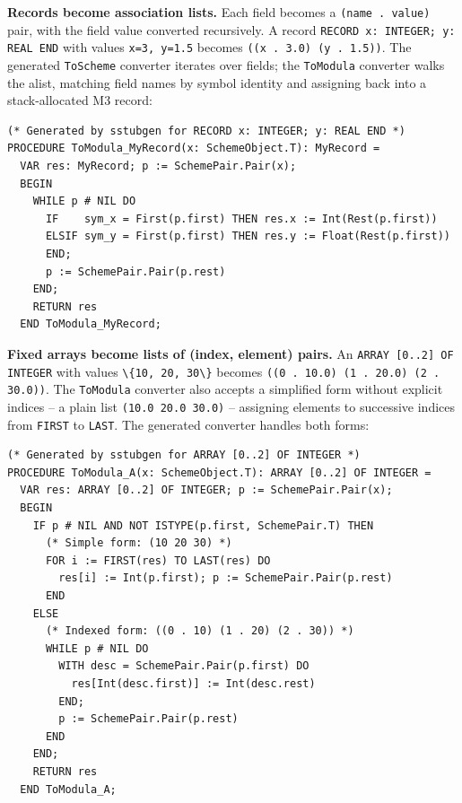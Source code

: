 \documentclass[
  12pt,
]{report}
\newcommand{\passthrough}[1]{#1}
\begin{document}
\textbf{Records become association lists.} Each field becomes a
\passthrough{\lstinline!(name . value)!} pair, with the field value
converted recursively. A record
\passthrough{\lstinline!RECORD x: INTEGER; y: REAL END!} with values
\passthrough{\lstinline!x=3, y=1.5!} becomes
\passthrough{\lstinline!((x . 3.0) (y . 1.5))!}. The generated
\passthrough{\lstinline!ToScheme!} converter iterates over fields; the
\passthrough{\lstinline!ToModula!} converter walks the alist, matching
field names by symbol identity and assigning back into a stack-allocated
M3 record:

\begin{lstlisting}
(* Generated by sstubgen for RECORD x: INTEGER; y: REAL END *)
PROCEDURE ToModula_MyRecord(x: SchemeObject.T): MyRecord =
  VAR res: MyRecord; p := SchemePair.Pair(x);
  BEGIN
    WHILE p # NIL DO
      IF    sym_x = First(p.first) THEN res.x := Int(Rest(p.first))
      ELSIF sym_y = First(p.first) THEN res.y := Float(Rest(p.first))
      END;
      p := SchemePair.Pair(p.rest)
    END;
    RETURN res
  END ToModula_MyRecord;
\end{lstlisting}

\textbf{Fixed arrays become lists of (index, element) pairs.} An
\passthrough{\lstinline!ARRAY [0..2] OF INTEGER!} with values
\passthrough{\lstinline!\{10, 20, 30\}!} becomes
\passthrough{\lstinline!((0 . 10.0) (1 . 20.0) (2 . 30.0))!}. The
\passthrough{\lstinline!ToModula!} converter also accepts a simplified
form without explicit indices -- a plain list
\passthrough{\lstinline!(10.0 20.0 30.0)!} -- assigning elements to
successive indices from \passthrough{\lstinline!FIRST!} to
\passthrough{\lstinline!LAST!}. The generated converter handles both
forms:

\begin{lstlisting}
(* Generated by sstubgen for ARRAY [0..2] OF INTEGER *)
PROCEDURE ToModula_A(x: SchemeObject.T): ARRAY [0..2] OF INTEGER =
  VAR res: ARRAY [0..2] OF INTEGER; p := SchemePair.Pair(x);
  BEGIN
    IF p # NIL AND NOT ISTYPE(p.first, SchemePair.T) THEN
      (* Simple form: (10 20 30) *)
      FOR i := FIRST(res) TO LAST(res) DO
        res[i] := Int(p.first); p := SchemePair.Pair(p.rest)
      END
    ELSE
      (* Indexed form: ((0 . 10) (1 . 20) (2 . 30)) *)
      WHILE p # NIL DO
        WITH desc = SchemePair.Pair(p.first) DO
          res[Int(desc.first)] := Int(desc.rest)
        END;
        p := SchemePair.Pair(p.rest)
      END
    END;
    RETURN res
  END ToModula_A;
\end{lstlisting}
\end{document}
